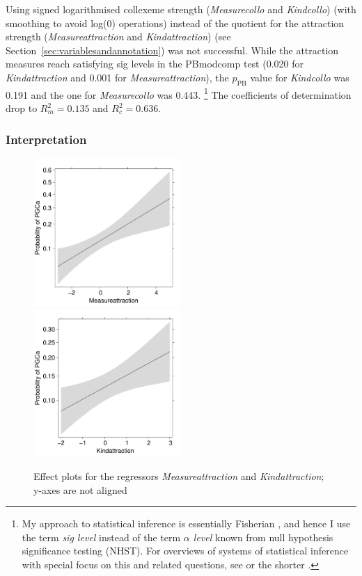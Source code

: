 Using signed logarithmised collexeme strength (\textit{Measurecollo} and \textit{Kindcollo}) (with smoothing to avoid log(0) operations) instead of the quotient for the attraction strength (\textit{Measureattraction} and \textit{Kindattraction}) (see Section~\ref{sec:variablesandannotation}) was not successful.
While the attraction measures reach satisfying sig levels in the PBmodcomp test (0.020 for \textit{Kindattraction} and 0.001 for \textit{Measureattraction}), the $p_{\text{PB}}$ value for \textit{Kindcollo} was 0.191 and the one for \textit{Measurecollo} was 0.443.%
\footnote{My approach to statistical inference is essentially Fisherian \citep{Fisher1935,Fisher1959}, and hence I use the term \textit{sig level} instead of the term \textit{$\alpha$ level} known from null hypothesis significance testing (NHST).
For overviews of systems of statistical inference with special focus on this and related questions, see \citet{Lehmann1993,Lehmann2011} or the shorter \citet{Perezgonzalez2015}.}
The coefficients of determination drop to $R_m^2=0.135$ and $R^2_c=0.636$.

\subsubsection{Interpretation}

\begin{figure}[h!]
  \centering
  \includegraphics[width=0.5\textwidth]{../R/output/corpus_Measureattraction}~\includegraphics[width=0.5\textwidth]{../R/output/corpus_Kindattraction}
  \caption{Effect plots for the regressors \textit{Measureattraction} and \textit{Kindattraction}; y-axes are not aligned}
  \label{fig:eff:attraction}
\end{figure}


